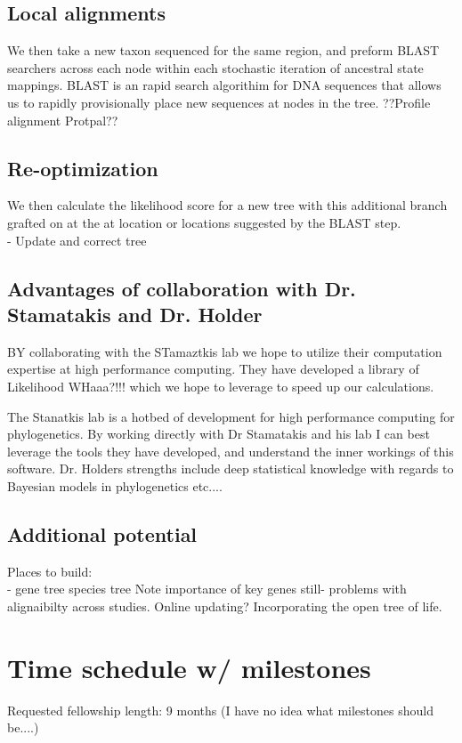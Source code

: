 \documentclass[10pt]{article}
\begin{document}
\subsection{Local alignments}
We then take a new taxon sequenced for the same region, and preform BLAST searchers across each node within each stochastic iteration of ancestral state mappings. BLAST is an rapid search algorithim for DNA sequences that allows us to rapidly provisionally place new sequences at nodes in the tree. 
??Profile alignment \cite{loytynoja_accurate_2012}
Protpal??

\subsection{Re-optimization}
We then calculate the likelihood score for a new tree with this additional branch grafted on at the at location or locations suggested by the BLAST step. 
\\     - Update and correct tree


\subsection{Advantages of collaboration with Dr. Stamatakis and Dr. Holder}
BY collaborating with the STamaztkis lab we hope to utilize their computation expertise at high performance computing. They have developed a library of Likelihood WHaaa?!!! which we hope to leverage to speed up our calculations.

The Stanatkis lab is a hotbed of development for high performance computing for phylogenetics. By working directly with Dr Stamatakis and his lab I can best leverage the tools they have developed, and understand the inner workings of this software.
Dr. Holders strengths include deep statistical knowledge with regards to Bayesian models in phylogenetics etc....


\subsection{Additional potential}
     Places to build:
\\         - gene tree species tree
Note importance of key genes still- problems with alignaibilty across studies.
Online updating?
Incorporating the open tree of life.


         
\section{Time schedule w/ milestones}
   Requested fellowship length: 9 months
   (I have no idea what milestones should be....)
 
\end{document}
